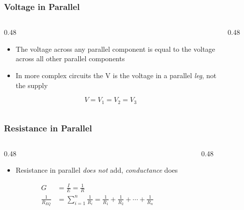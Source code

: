 \begin{frame}
    \frametitle{Voltage in Parallel}

	\begin{columns}
        \begin{column}{0.48\linewidth}
            \begin{itemize}
                \item The voltage across any parallel component is equal to the voltage across all other parallel components
                \item In more complex circuits the V is the voltage in a parallel \emph{leg}, not the supply
            \end{itemize}
            \[V=V_{1}=V_{2}=V_{3}\]
        \end{column}
        \begin{column}{0.48\linewidth}
            \begin{figure}
                \centering
                \resizebox{\columnwidth}{!}{
                    
                }
            \end{figure}
        \end{column}
	\end{columns}
\end{frame}

\begin{frame}
    \frametitle{Resistance in Parallel}

	\begin{columns}
        \begin{column}{0.48\linewidth}
            \begin{itemize}[<+- | alert@+>]
                \item Resistance in parallel \emph{does not} add, \emph{conductance} does
            \end{itemize}
            \[
                \begin{aligned}
                    G&=\frac{I}{E}=\frac{1}{R}\\
                    \frac{1}{R_{EQ}}&=\sum_{i=1}^{n}\frac{1}{R_i}=\frac{1}{R_1}+\frac{1}{R_2}+ \cdots + \frac{1}{R_n}
                \end{aligned}
            \]
        \end{column}
        \begin{column}{0.48\linewidth}
            \begin{figure}
                \centering
                \resizebox{\columnwidth}{!}{
                    
                }
            \end{figure}
        \end{column}
	\end{columns}
\end{frame}

